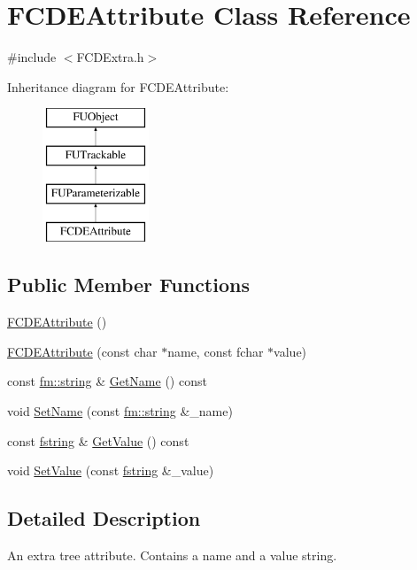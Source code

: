 \hypertarget{classFCDEAttribute}{
\section{FCDEAttribute Class Reference}
\label{classFCDEAttribute}
}


{\ttfamily \#include $<$FCDExtra.h$>$}

Inheritance diagram for FCDEAttribute:\begin{figure}[H]
\begin{center}
\leavevmode
\includegraphics[height=4.000000cm]{classFCDEAttribute}
\end{center}
\end{figure}
\subsection*{Public Member Functions}
\begin{DoxyCompactItemize}
\item 
\hyperlink{classFCDEAttribute_a5bd4a74cf8705804a3bb43336d7eeb80}{FCDEAttribute} ()
\item 
\hyperlink{classFCDEAttribute_a653f729f45533b8ece04792d054967bd}{FCDEAttribute} (const char $\ast$name, const fchar $\ast$value)
\item 
const \hyperlink{classfm_1_1stringT}{fm::string} \& \hyperlink{classFCDEAttribute_a66cbc2e664e7fdf7a994af9744787813}{GetName} () const 
\item 
void \hyperlink{classFCDEAttribute_a1af3d0cbe4b804a053a09dbdb9275a04}{SetName} (const \hyperlink{classfm_1_1stringT}{fm::string} \&\_\-name)
\item 
const \hyperlink{classfm_1_1stringT}{fstring} \& \hyperlink{classFCDEAttribute_ae09637bac4d6ae26ac7afb01a241c53e}{GetValue} () const 
\item 
void \hyperlink{classFCDEAttribute_ae85287f77ddb40b5797d83fcd686f549}{SetValue} (const \hyperlink{classfm_1_1stringT}{fstring} \&\_\-value)
\end{DoxyCompactItemize}


\subsection{Detailed Description}
An extra tree attribute. Contains a name and a value string. 


